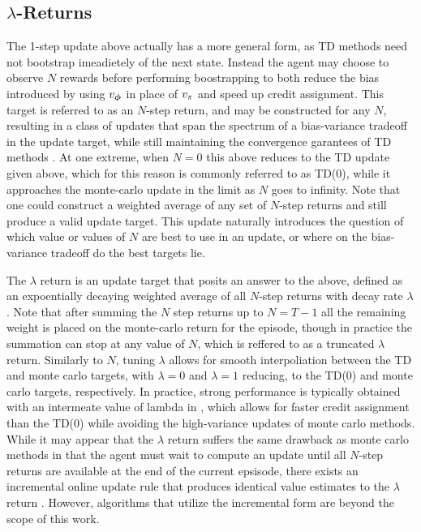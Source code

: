 \subsection{$\lambda$-Returns}
The 1-step update above actually has a more general form, as TD methods need not bootstrap imeadietely of the next state. Instead the agent may choose to observe $N$ rewards before performing boostrapping to both reduce the bias introduced by using $v_{\bm \phi}$ in place of $v_{\pi}$ and speed up credit assignment. This target is referred to as an $N$-step return, and may be constructed for any $N$, resulting in a class of updates that span the spectrum of a bias-variance tradeoff in the update target, while still maintaining the convergence garantees of TD methods .
At one extreme, when $N = 0$ this above reduces to the TD update given above, which for this reason is commonly referred to as TD(0), while it approaches the monte-carlo update in the limit as $N$ goes to infinity. Note that one could construct a weighted average of any set of $N$-step returns and still produce a valid update target. This update naturally introduces the question of which value or values of $N$ are best to use in an update, or where on the bias-variance tradeoff do the best targets lie.  

The $\lambda$ return is an update target that posits an answer to the above, defined as an expoentially decaying weighted average of all $N$-step returns with decay rate $\lambda$.
Note that after summing the $N$ step returns up to $N=T-1$ %
all the remaining weight is placed on the monte-carlo return for the episode, though in practice the summation can stop at any value of $N$, which is reffered to as a truncated $\lambda$ return. Similarly to $N$, tuning $\lambda$ allows for smooth interpoliation between the TD and monte carlo targets, with $\lambda=0$ and $\lambda=1$ reducing, to the TD(0) and monte carlo targets, respectively. In practice, strong performance is typically obtained with an intermeate value of lambda in %
,  which allows for faster credit assignment than the TD(0) while avoiding the high-variance updates of monte carlo methods. 
While it may appear that the $\lambda$ return suffers the same drawback as monte carlo methods in that the agent must wait to compute an update until all $N$-step returns are available at the end of the current epsisode, there exists an incremental online update rule that produces identical value estimates to the  $\lambda$ return . However, algorithms that utilize the incremental form are beyond the scope of this work. 

